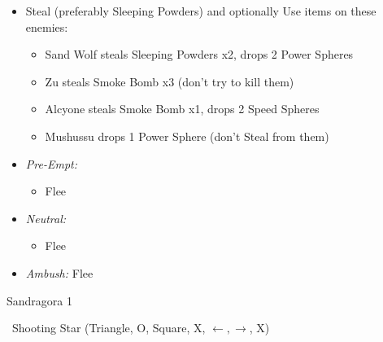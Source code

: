 \begin{encounters}
    \begin{itemize}
        \item Steal (preferably Sleeping Powders) and optionally Use items on these enemies:
        \begin{itemize}
            \item Sand Wolf steals Sleeping Powders x2, drops 2 Power Spheres
            \item Zu steals Smoke Bomb x3 (don't try to kill them)
            \item Alcyone steals Smoke Bomb x1, drops 2 Speed Spheres
            \item Mushussu drops 1 Power Sphere (don't Steal from them)
        \end{itemize}
        \item \textit{Pre-Empt:}
        \begin{itemize}
            \tidusf Defend
            \rikkuf Steal or Use a Smoke Bomb/Silence Grenade/Sleeping Powder
            \luluf Defend
            \item Flee
        \end{itemize}
        \item \textit{Neutral:}
        \begin{itemize}
            \switch{\tidus}{\kimahri}
            \kimahrif Steal
            \rikkuf Switch for \tidus\ or Use a Smoke Bomb/Silence Grenade/Sleeping Powder
            \item Flee
        \end{itemize}
        \item \textit{Ambush:} Flee
    \end{itemize}
\end{encounters}
\begin{battle}{Sandragora 1}
    \begin{itemize}
        \switch{\tidus}{\auron}
        \auronf \od\ Shooting Star (Triangle, O, Square, X, $\leftarrow, \rightarrow$, X)
    \end{itemize}
\end{battle}
\bothnpsingle
{}
